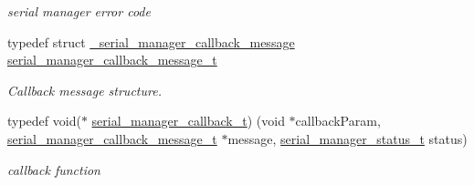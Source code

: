 \begin{DoxyCompactItemize}
\begin{DoxyCompactList}\small\item\em serial manager error code \end{DoxyCompactList}\item 
\mbox{\label{group__serialmanager_gaaf1dca4823669f7e5e243b1e8826eb85}} 
typedef struct \mbox{\hyperlink{struct__serial__manager__callback__message}{\+\_\+serial\+\_\+manager\+\_\+callback\+\_\+message}} \mbox{\hyperlink{group__serialmanager_gaaf1dca4823669f7e5e243b1e8826eb85}{serial\+\_\+manager\+\_\+callback\+\_\+message\+\_\+t}}
\begin{DoxyCompactList}\small\item\em Callback message structure. \end{DoxyCompactList}\item 
\mbox{\label{group__serialmanager_gac6756c1884babe59f1e78b1cb9552c28}} 
typedef void($\ast$ \mbox{\hyperlink{group__serialmanager_gac6756c1884babe59f1e78b1cb9552c28}{serial\+\_\+manager\+\_\+callback\+\_\+t}}) (void $\ast$callback\+Param, \mbox{\hyperlink{group__serialmanager_gaaf1dca4823669f7e5e243b1e8826eb85}{serial\+\_\+manager\+\_\+callback\+\_\+message\+\_\+t}} $\ast$message, \mbox{\hyperlink{group__serialmanager_gac1d9f848c57ca245ad9da8d049369da9}{serial\+\_\+manager\+\_\+status\+\_\+t}} status)
\begin{DoxyCompactList}\small\item\em callback function \end{DoxyCompactList}\end{DoxyCompactItemize}
